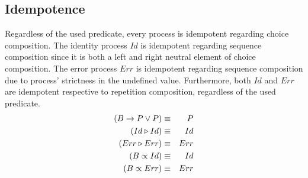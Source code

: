 \subsection{Idempotence}
\vspace*{-0.75em}
Regardless of the used predicate, every process is idempotent regarding choice composition. The identity process $Id$ is idempotent regarding sequence composition since it is both a left and right neutral element of choice composition. The error process $Err$ is idempotent regarding sequence composition due to process' strictness in the undefined value. Furthermore, both $Id$ and $Err$ are idempotent respective to repetition composition, regardless of the used predicate.
\vspace*{-0.75em}
\begin{eqnarray*}
  \left( B \to P \vee P \right) & \equiv & P \\
  \left( Id \triangleright Id \right) & \equiv & Id \\
  \left( Err \triangleright Err \right) & \equiv & Err \\
  \left( B \propto Id \right) & \equiv & Id \\
  \left( B \propto Err \right) & \equiv & Err
\end{eqnarray*}
\vspace*{-2em}